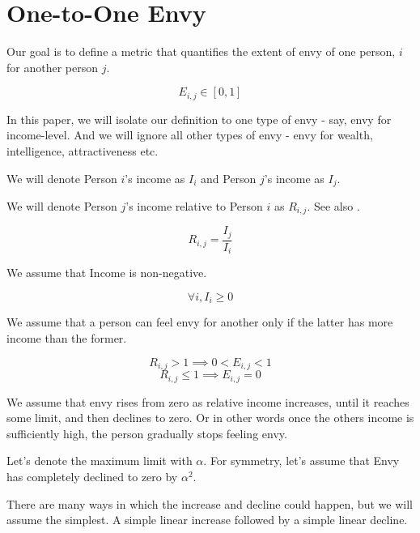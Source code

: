 
\section{One-to-One Envy}
Our goal is to define a metric that quantifies the extent of envy of one person, $i$ for another person $j$. 

\begin{equation}
E_{i,j} \in [0,1]
\end{equation}

In this paper, we will isolate our definition to one type of envy - say, envy for income-level. And we will ignore all other types of envy - envy for wealth, intelligence, attractiveness etc.

We will denote Person $i$'s income as $I_i$ and Person $j$'s income as $I_j$. 

We will denote Person $j$'s income relative to Person $i$ as $R_{i,j}$. See also \cite{enwiki:relative_income}.

\begin{equation}
    R_{i,j} = \frac{I_j}{I_i}
\end{equation}

We assume that Income is non-negative. 
    
\begin{equation}
    \forall i, I_i \ge 0
\end{equation}
    
We assume that a person can feel envy for another only if the latter has more income than  the former. 

\begin{equation}
    R_{i,j} > 1 \implies 0 < E_{i,j} < 1
\end{equation}
\begin{equation}
    R_{i,j} \le 1 \implies E_{i,j} = 0 
\end{equation}
 
We assume that envy rises from zero as relative income increases, until it reaches some limit, and then declines to zero. Or in other words once the others income is sufficiently high, the person gradually stops feeling envy. 

Let's denote the maximum limit with $\alpha$. For symmetry, let's assume that Envy has completely declined to zero by $\alpha^2$.

There are many ways in which the increase and decline could happen, but we will assume the simplest. A simple linear increase followed by a simple linear decline. 

